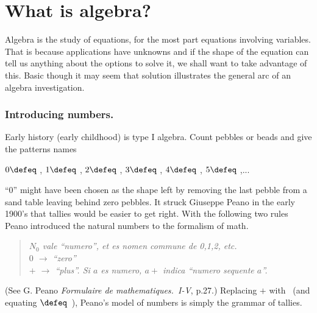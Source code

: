 \chapter{What is algebra?}

Algebra is the study of equations, for the most part equations involving variables.
That is because applications have unknowns and if 
the shape of the equation can tell us anything about the 
options to solve it, we shall want to take advantage of this.
Basic though it may seem that solution illustrates
the general arc of an algebra investigation.
\begin{center}
\end{center}

\subsection{Introducing numbers.}
Early history (early childhood) is type I algebra.  Count 
pebbles or beads and give the patterns names
\begin{center}
    $0\defeq$ \underline{\hspace{5mm}}, 
    $1\defeq$ \StrokeOne,
    $2\defeq$ \StrokeTwo,
    $3\defeq$ \StrokeThree,
    $4\defeq$ \StrokeFour,
    $5\defeq$ \StrokeFive,...
\end{center}
``0'' might have been chosen as the shape left by removing the last pebble from a sand 
table leaving behind zero pebbles.
It struck Giuseppe Peano in the early 1900's that tallies 
would be easier to get right. With the following two rules
Peano introduced the natural numbers to the formalism of math.
\begin{quote}
    \textit{
    $N_0$ vale ``numero'', et es nomen commune de 0,1,2, etc.\\
    $0$ $\to$  ``zero''\\
    $+$ $\to$ ``plus''.  Si $a$ es numero, $a+$ indica ``numero sequente $a$''.
    }
\end{quote}
(See G. Peano \emph{Formulaire de mathematiques.~I-V}, p.27.)
Replacing $+$ with \StrokeOne ~(and equating \StrokeFive$\defeq$\StrokeFour~\StrokeOne),
Peano's model of numbers is simply the grammar of tallies.



